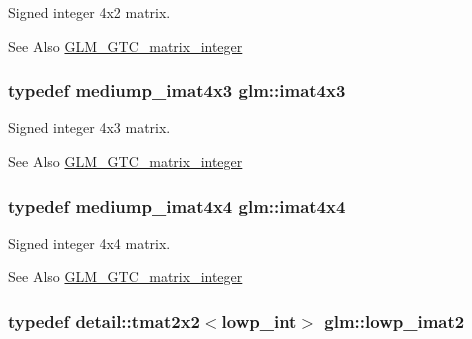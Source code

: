 Signed integer 4x2 matrix. 

\begin{DoxySeeAlso}{See Also}
\hyperlink{group__gtc__matrix__integer}{G\-L\-M\-\_\-\-G\-T\-C\-\_\-matrix\-\_\-integer} 
\end{DoxySeeAlso}
\hypertarget{group__gtc__matrix__integer_gaa4cca8e80c0603239eda452860063844}{
\subsubsection[{imat4x3}]{\setlength{\rightskip}{0pt plus 5cm}typedef mediump\-\_\-imat4x3 {\bf glm\-::imat4x3}}}\label{group__gtc__matrix__integer_gaa4cca8e80c0603239eda452860063844}


Signed integer 4x3 matrix. 

\begin{DoxySeeAlso}{See Also}
\hyperlink{group__gtc__matrix__integer}{G\-L\-M\-\_\-\-G\-T\-C\-\_\-matrix\-\_\-integer} 
\end{DoxySeeAlso}
\hypertarget{group__gtc__matrix__integer_ga367d8d5281ff82f1215a227dd2ea5ba9}{
\subsubsection[{imat4x4}]{\setlength{\rightskip}{0pt plus 5cm}typedef mediump\-\_\-imat4x4 {\bf glm\-::imat4x4}}}\label{group__gtc__matrix__integer_ga367d8d5281ff82f1215a227dd2ea5ba9}


Signed integer 4x4 matrix. 

\begin{DoxySeeAlso}{See Also}
\hyperlink{group__gtc__matrix__integer}{G\-L\-M\-\_\-\-G\-T\-C\-\_\-matrix\-\_\-integer} 
\end{DoxySeeAlso}
\hypertarget{group__gtc__matrix__integer_ga70fa8b07f1a12d400d669e4978a6795c}{
\subsubsection[{lowp\-\_\-imat2}]{\setlength{\rightskip}{0pt plus 5cm}typedef detail\-::tmat2x2$<$lowp\-\_\-int$>$ {\bf glm\-::lowp\-\_\-imat2}}}\label{group__gtc__matrix__integer_ga70fa8b07f1a12d400d669e4978a6795c}


